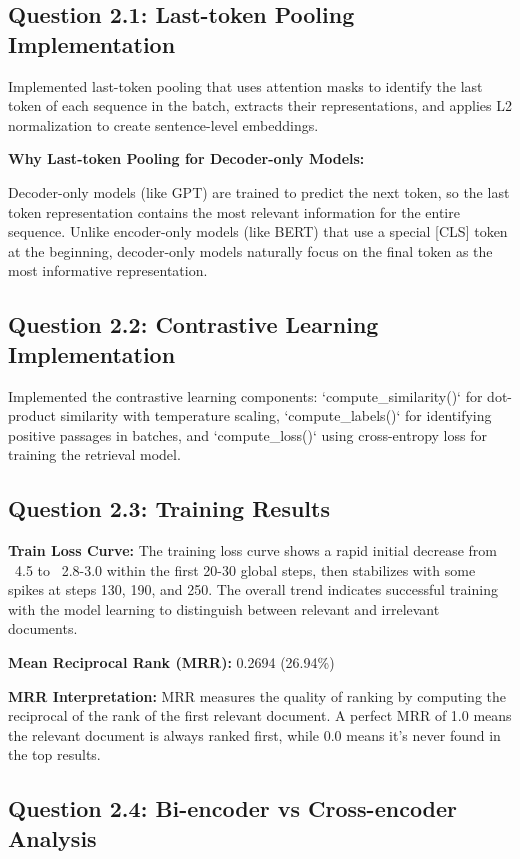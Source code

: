 \documentclass[11pt]{article}
\begin{document}
\subsection{Question 2.1: Last-token Pooling Implementation}

Implemented last-token pooling that uses attention masks to identify the last token of each sequence in the batch, extracts their representations, and applies L2 normalization to create sentence-level embeddings.

\textbf{Why Last-token Pooling for Decoder-only Models:}

Decoder-only models (like GPT) are trained to predict the next token, so the last token representation contains the most relevant information for the entire sequence. Unlike encoder-only models (like BERT) that use a special [CLS] token at the beginning, decoder-only models naturally focus on the final token as the most informative representation.

\subsection{Question 2.2: Contrastive Learning Implementation}

Implemented the contrastive learning components: `compute_similarity()` for dot-product similarity with temperature scaling, `compute_labels()` for identifying positive passages in batches, and `compute_loss()` using cross-entropy loss for training the retrieval model.

\subsection{Question 2.3: Training Results}

\textbf{Train Loss Curve:} The training loss curve shows a rapid initial decrease from ~4.5 to ~2.8-3.0 within the first 20-30 global steps, then stabilizes with some spikes at steps 130, 190, and 250. The overall trend indicates successful training with the model learning to distinguish between relevant and irrelevant documents.

\textbf{Mean Reciprocal Rank (MRR):} 0.2694 (26.94\%)

\textbf{MRR Interpretation:} MRR measures the quality of ranking by computing the reciprocal of the rank of the first relevant document. A perfect MRR of 1.0 means the relevant document is always ranked first, while 0.0 means it's never found in the top results.

\subsection{Question 2.4: Bi-encoder vs Cross-encoder Analysis}
\end{document}
